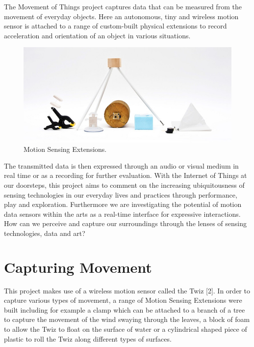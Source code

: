 \documentclass{sigchi}
\begin{document}
The Movement of Things project captures data that can
be measured from the movement of everyday objects.
Here an autonomous, tiny and wireless motion sensor
is attached to a range of custom-built physical
extensions to record acceleration and orientation of an
object in various situations.

\begin{figure}[H]
\centering
\includegraphics[width=\columnwidth]{pics/extensions}
\caption{Motion Sensing Extensions.}
\label{fig:extensions}
\end{figure}

The transmitted data is
then expressed through an audio or visual medium in
real time or as a recording for further evaluation. With
the Internet of Things at our doorsteps, this project
aims to comment on the increasing ubiquitousness of
sensing technologies in our everyday lives and practices
through performance, play and exploration.
Furthermore we are investigating the potential of
motion data sensors within the arts as a real-time
interface for expressive interactions. How can we
perceive and capture our surroundings through the
lenses of sensing technologies, data and art?

\section{Capturing Movement}

This project makes use of a wireless motion sensor
called the Twiz [2]. In order to capture various types of
movement, a range of Motion Sensing Extensions were
built including for example a clamp which can be
attached to a branch of a tree to capture the movement
of the wind swaying through the leaves, a block of
foam to allow the Twiz to float on the surface of water
or a cylindrical shaped piece of plastic to roll the Twiz
along different types of surfaces.
\end{document}

